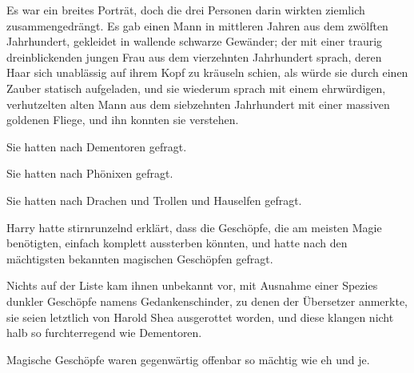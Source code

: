 Es war ein breites Porträt, doch die drei Personen darin wirkten ziemlich zusammengedrängt. Es gab einen Mann in mittleren Jahren aus dem zwölften Jahrhundert, gekleidet in wallende schwarze Gewänder; der mit einer traurig dreinblickenden jungen Frau aus dem vierzehnten Jahrhundert sprach, deren Haar sich unablässig auf ihrem Kopf zu kräuseln schien, als würde sie durch einen Zauber statisch aufgeladen, und sie wiederum sprach mit einem ehrwürdigen, verhutzelten alten Mann aus dem siebzehnten Jahrhundert mit einer massiven goldenen Fliege, und ihn konnten sie verstehen.

Sie hatten nach Dementoren gefragt.

Sie hatten nach Phönixen gefragt.

Sie hatten nach Drachen und Trollen und Hauselfen gefragt.

Harry hatte stirnrunzelnd erklärt, dass die Geschöpfe, die am meisten Magie benötigten, einfach komplett aussterben könnten, und hatte nach den mächtigsten bekannten magischen Geschöpfen gefragt.

Nichts auf der Liste kam ihnen unbekannt vor, mit Ausnahme einer Spezies dunkler Geschöpfe namens Gedankenschinder, zu denen der Übersetzer anmerkte, sie seien letztlich von Harold Shea ausgerottet worden, und diese klangen nicht halb so furchterregend wie Dementoren.

Magische Geschöpfe waren gegenwärtig offenbar so mächtig wie eh und je.

